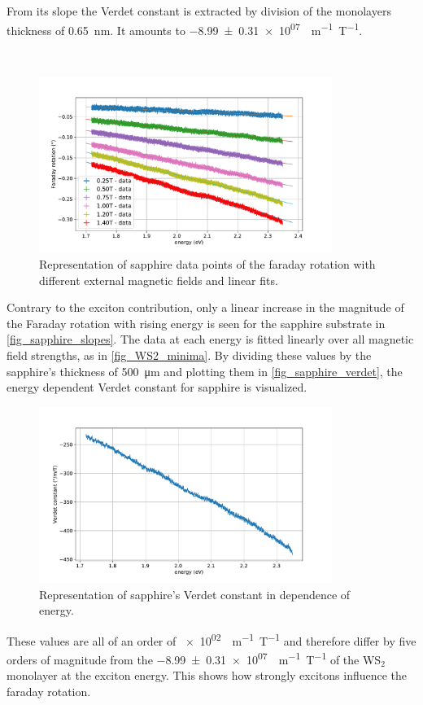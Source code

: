 From its slope the Verdet constant is extracted by division of the monolayers thickness of \SI{0.65}{\nano\meter}.
It amounts to \SI{-8.99+-0.31e+07}{\deg m^{-1} T^{-1}}.

\

\begin{figure}[!ht]
    \centering
    \includegraphics[width=0.85\textwidth]{plots/sapphire_lins.pdf}
    \caption{Representation of sapphire data points of the faraday rotation with different external magnetic fields and linear fits.}
    \label{fig_sapphire_lins}
\end{figure}
Contrary to the exciton contribution, only a linear increase in the magnitude of the Faraday rotation with rising energy is seen for the sapphire substrate in \cref{fig_sapphire_slopes}.
The data at each energy is fitted linearly over all magnetic field strengths, as in \cref{fig_WS2_minima}.
By dividing these values by the sapphire's thickness of \SI{500}{\micro\meter} and plotting them in \cref{fig_sapphire_verdet}, the energy dependent Verdet constant for sapphire is visualized.

\begin{figure}[!ht]
    \centering
    \includegraphics[width=0.85\textwidth]{plots/sapphire_verdets.pdf}
    \caption{Representation of sapphire's Verdet constant in dependence of energy.}
    \label{fig_sapphire_verdets}
\end{figure}

These values are all of an order of \SI{e+02}{{\deg m^{-1} T^{-1}}} and therefore differ by five orders of magnitude from the \SI{-8.99+-0.31e+07}{\deg m^{-1} T^{-1}} of the WS$_2$ monolayer at the exciton energy.
This shows how strongly excitons influence the faraday rotation.

